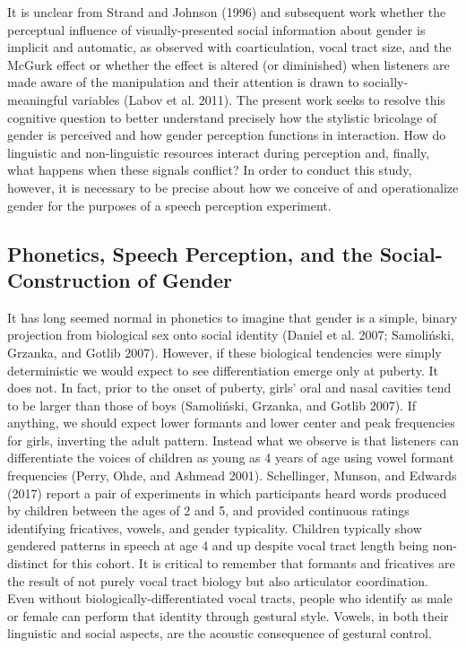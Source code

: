 \documentclass[
  letterpaper,
  DIV=11,
  numbers=noendperiod]{scrartcl}
\begin{document}
It is unclear from Strand and Johnson (1996) and subsequent work whether
the perceptual influence of visually-presented social information about
gender is implicit and automatic, as observed with coarticulation, vocal
tract size, and the McGurk effect or whether the effect is altered (or
diminished) when listeners are made aware of the manipulation and their
attention is drawn to socially-meaningful variables (Labov et al. 2011).
The present work seeks to resolve this cognitive question to better
understand precisely how the stylistic bricolage of gender is perceived
and how gender perception functions in interaction. How do linguistic
and non-linguistic resources interact during perception and, finally,
what happens when these signals conflict? In order to conduct this
study, however, it is necessary to be precise about how we conceive of
and operationalize gender for the purposes of a speech perception
experiment.

\subsection{Phonetics, Speech Perception, and the Social-Construction of
Gender}\label{phonetics-speech-perception-and-the-social-construction-of-gender}

It has long seemed normal in phonetics to imagine that gender is a
simple, binary projection from biological sex onto social identity
(Daniel et al. 2007; Samoliński, Grzanka, and Gotlib 2007). However, if
these biological tendencies were simply deterministic we would expect to
see differentiation emerge only at puberty. It does not. In fact, prior
to the onset of puberty, girls' oral and nasal cavities tend to be
larger than those of boys (Samoliński, Grzanka, and Gotlib 2007). If
anything, we should expect lower formants and lower center and peak
frequencies for girls, inverting the adult pattern. Instead what we
observe is that listeners can differentiate the voices of children as
young as 4 years of age using vowel formant frequencies (Perry, Ohde,
and Ashmead 2001). Schellinger, Munson, and Edwards (2017) report a pair
of experiments in which participants heard words produced by children
between the ages of 2 and 5, and provided continuous ratings identifying
fricatives, vowels, and gender typicality. Children typically show
gendered patterns in speech at age 4 and up despite vocal tract length
being non-distinct for this cohort. It is critical to remember that
formants and fricatives are the result of not purely vocal tract biology
but also articulator coordination. Even without
biologically-differentiated vocal tracts, people who identify as male or
female can perform that identity through gestural style. Vowels, in both
their linguistic and social aspects, are the acoustic consequence of
gestural control.
\end{document}
